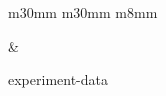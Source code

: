 \begin{figure}[t]
\begin{tabular}{m{30mm} m{30mm} m{8mm}}
\begin{minipage}[b]{\linewidth}
            \vspace{-9mm}
            \caption*{}
            \vspace{1mm}
        \end{minipage} &
         \\
    \end{tabular}
    \vspace{-3mm}
    \caption{experiment-data}
    \label{fig:experiment-data}
\end{figure}
